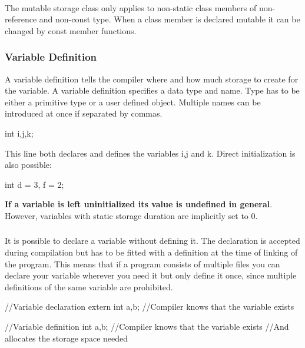 \documentclass[10pt,a4paper]{scrartcl}
\begin{document}
\begin{multicols*}{2}
\paragraph{}

The mutable storage class only applies to non-static class members of non-reference and non-const type. When a class member is declared mutable it can be changed by const member functions.

\subsubsection{Variable Definition}

A variable definition tells the compiler where and how much storage to create for the variable. A variable definition specifies a data type and name. Type has to be either a primitive type or a user defined object. Multiple names can be introduced at once if separated by commas.

\begin{TPCpp}
int i,j,k;
\end{TPCpp}

This line both declares and defines the variables i,j and k.
Direct initialization is also possible:

\begin{TPCpp}
int d = 3, f = 2;
\end{TPCpp}

\textbf{If a variable is left uninitialized its value is undefined in general}. However, variables with static storage duration are implicitly set to 0.

\subsubsection{}

It is possible to declare a variable without defining it. The declaration is accepted during compilation but has to be fitted with a definition at the time of linking of the program. This means that if a program consists of multiple files you can declare your variable wherever you need it but only define it once, since multiple definitions of the same variable are prohibited.

\begin{TPCpp}
//Variable declaration
extern int a,b; //Compiler knows that the variable exists

//Variable definition
int a,b; //Compiler knows that the variable exists
         //And allocates the storage space needed
\end{TPCpp}


\end{multicols*}
\end{document}
